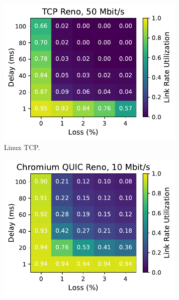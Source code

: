 \begin{figure}[ht]
\begin{subfigure}[b]{0.22\linewidth}
        \includegraphics[width=\linewidth,trim={0 0 2cm 0},clip]{splitting/figures/heatmaps/heatmap_tcp_reno_50mbps.pdf}
        \caption{Linux TCP.}
    \end{subfigure}
    \begin{subfigure}[b]{0.22\linewidth}
        \includegraphics[width=\linewidth,trim={0 0 2cm 0},clip]{splitting/figures/heatmaps/heatmap_quic_reno_10mbps.pdf}

\end{subfigure}
\end{figure}
